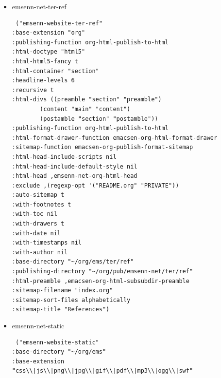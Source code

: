\documentclass[11pt]{article}
\begin{document}
\begin{itemize}
\begin{itemize}
\begin{itemize}
\begin{itemize}
\begin{verbatim}
:recursive t
:html-divs ((preamble "section" "preamble")
	    (content "main" "content")
	    (postamble "section" "postamble"))
:publishing-function org-html-publish-to-html
:html-format-drawer-function emacsen-org-html-format-drawer
:sitemap-function emacsen-org-publish-format-sitemap
:html-head-include-scripts nil
:html-head-include-default-style nil
:html-head ,emsenn-net-org-html-head
:exclude ,(regexp-opt '("README.org" "PRIVATE"))
:auto-sitemap t
:with-footnotes t
:with-toc nil
:with-drawers t
:with-date nil
:with-timestamps nil
:with-author nil
:base-directory "~/org/ems/ter/adv"
:publishing-directory "~/org/pub/emsenn-net/ter/adv"
:html-preamble ,emacsen-org-html-subsubdir-preamble
:sitemap-filename "index.org"
:sitemap-sort-files alphabetically
:sitemap-title "References")
\end{verbatim}
\item emsenn-net-ter-ref
\label{sec:org4e7fcf6}
\begin{verbatim}
 ("emsenn-website-ter-ref"
:base-extension "org"
:publishing-function org-html-publish-to-html
:html-doctype "html5"
:html-html5-fancy t
:html-container "section"
:headline-levels 6
:recursive t
:html-divs ((preamble "section" "preamble")
	    (content "main" "content")
	    (postamble "section" "postamble"))
:publishing-function org-html-publish-to-html
:html-format-drawer-function emacsen-org-html-format-drawer
:sitemap-function emacsen-org-publish-format-sitemap
:html-head-include-scripts nil
:html-head-include-default-style nil
:html-head ,emsenn-net-org-html-head
:exclude ,(regexp-opt '("README.org" "PRIVATE"))
:auto-sitemap t
:with-footnotes t
:with-toc nil
:with-drawers t
:with-date nil
:with-timestamps nil
:with-author nil
:base-directory "~/org/ems/ter/ref"
:publishing-directory "~/org/pub/emsenn-net/ter/ref"
:html-preamble ,emacsen-org-html-subsubdir-preamble
:sitemap-filename "index.org"
:sitemap-sort-files alphabetically
:sitemap-title "References")
\end{verbatim}
\item emsenn-net-static
\label{sec:orge07b5be}
\begin{verbatim}
 ("emsenn-website-static"
:base-directory "~/org/ems"
:base-extension "css\\|js\\|png\\|jpg\\|gif\\|pdf\\|mp3\\|ogg\\|swf"

\end{verbatim}
\end{itemize}
\end{itemize}
\end{itemize}
\end{itemize}
\end{document}
